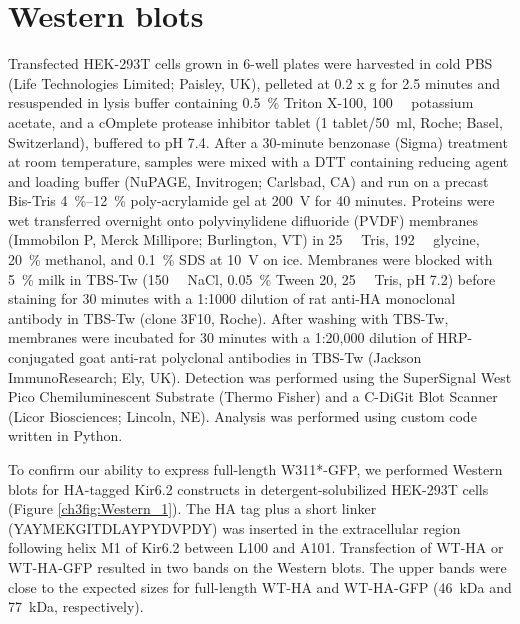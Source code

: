 \section{Western blots}
Transfected HEK-293T cells grown in 6-well plates were harvested in cold PBS (Life Technologies Limited; Paisley, UK), pelleted at 0.2 x g for 2.5 minutes and resuspended in lysis buffer containing \SI{0.5}{\percent} Triton X-100, \SI{100}{\milli\Molar} potassium acetate, and a cOmplete protease inhibitor tablet (1 tablet/\SI{50}{\milli\litre}, Roche; Basel, Switzerland), buffered to pH 7.4.
After a 30-minute benzonase (Sigma) treatment at room temperature, samples were mixed with a DTT containing reducing agent and loading buffer (NuPAGE, Invitrogen; Carlsbad, CA) and run on a precast Bis-Tris \SIrange{4}{12}{\percent} poly-acrylamide gel at \SI{200}{\volt} for 40 minutes.
Proteins were wet transferred overnight onto polyvinylidene difluoride (PVDF) membranes (Immobilon P, Merck Millipore; Burlington, VT) in \SI{25}{\milli\Molar} Tris, \SI{192}{\milli\Molar} glycine, \SI{20}{\percent} methanol, and \SI{0.1}{\percent} SDS at \SI{10}{\volt} on ice.
Membranes were blocked with \SI{5}{\percent} milk in TBS-Tw (\SI{150}{\milli\Molar} NaCl, \SI{0.05}{\percent} Tween 20, \SI{25}{\milli\Molar} Tris, pH 7.2) before staining for 30 minutes with a 1:1000 dilution of rat anti-HA monoclonal antibody in TBS-Tw (clone 3F10, Roche).
After washing with TBS-Tw, membranes were incubated for 30 minutes with a 1:20,000 dilution of HRP-conjugated goat anti-rat polyclonal antibodies in TBS-Tw (Jackson ImmunoResearch; Ely, UK).
Detection was performed using the SuperSignal West Pico Chemiluminescent Substrate (Thermo Fisher) and a C-DiGit Blot Scanner (Licor Biosciences; Lincoln, NE).
Analysis was performed using custom code written in Python.

To confirm our ability to express full-length W311*-GFP, we performed Western blots for HA-tagged Kir6.2 constructs in detergent-solubilized HEK-293T cells (Figure \ref{ch3fig:Western_1}).
The HA tag plus a short linker (YAYMEKGITDLAYPYDVPDY) was inserted in the extracellular region following helix M1 of Kir6.2 between L100 and A101.
Transfection of WT-HA or WT-HA-GFP resulted in two bands on the Western blots.
The upper bands were close to the expected sizes for full-length WT-HA and WT-HA-GFP (\SI{46}{\kilo\dalton} and \SI{77}{\kilo\dalton}, respectively).

